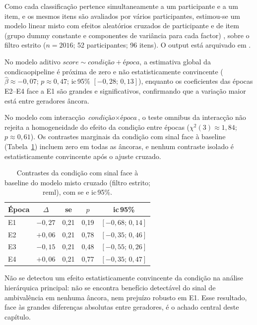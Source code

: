 Como cada classificação pertence simultaneamente a um participante e a um item, e os mesmos itens são avaliados por vários participantes, estimou-se um modelo linear misto com efeitos aleatórios cruzados de participante e de item (grupo dummy constante e componentes de variância para cada factor) \parencite{Baayen2008Mixed}, sobre o filtro estrito (\(n=2016\); 52 participantes; 96 itens). O output está arquivado em .

No modelo aditivo \(\textit{score} \sim \textit{condição} + \textit{época}\), a estimativa global da \gls{condicaopipeline} é próxima de zero e não estatisticamente convincente (\(\hat\beta \approx -0{,}07\); \(p \approx 0{,}47\); \gls{ic}\,95\% \([-0{,}28;\,0{,}13]\)), enquanto os coeficientes das épocas E2--E4 face a E1 são grandes e significativos, confirmando que a variação maior está entre geradores âncora.

No modelo com interacção \(\textit{condição}\times\textit{época}\), o teste omnibus da interacção não rejeita a homogeneidade do efeito da condição entre épocas (\(\chi^2(3) \approx 1{,}84\); \(p \approx 0{,}61\)). Os contrastes marginais da condição com sinal face à baseline (Tabela~\ref{tab:misto_contrastes}) incluem zero em todas as âncoras, e nenhum contraste isolado é estatisticamente convincente após o ajuste cruzado.

\begin{table}[ht]
\centering
\caption[Contrastes do modelo misto cruzado.]{Contrastes da condição com sinal face à baseline do modelo misto cruzado (filtro estrito; \acrshort{reml}), com \acrshort{se} e \acrshort{ic}\,95\%.}
\label{tab:misto_contrastes}
\begin{tabular}{lcccc}
\hline
Época & \(\Delta\) & \acrshort{se} & \(p\) & \acrshort{ic}\,95\% \\
\hline
E1 & $-0{,}27$ & 0{,}21 & 0{,}19 & $[-0{,}68;\,0{,}14]$ \\
E2 & $+0{,}06$ & 0{,}21 & 0{,}78 & $[-0{,}35;\,0{,}46]$ \\
E3 & $-0{,}15$ & 0{,}21 & 0{,}48 & $[-0{,}55;\,0{,}26]$ \\
E4 & $+0{,}06$ & 0{,}21 & 0{,}77 & $[-0{,}35;\,0{,}47]$ \\
\hline
\end{tabular}
\end{table}

Não se detectou um efeito estatisticamente convincente da condição na análise hierárquica principal: não se encontra benefício detectável do sinal de ambivalência em nenhuma âncora, nem prejuízo robusto em E1. Esse resultado, face às grandes diferenças absolutas entre geradores, é o achado central deste capítulo.

